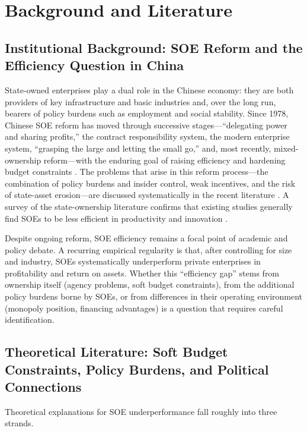 \documentclass[11pt,a4paper]{article}
\begin{document}
\section{Background and Literature}

\subsection{Institutional Background: SOE Reform and the Efficiency Question in China}

State-owned enterprises play a dual role in the Chinese economy: they are both providers of key infrastructure and basic industries and, over the long run, bearers of policy burdens such as employment and social stability. Since 1978, Chinese SOE reform has moved through successive stages---``delegating power and sharing profits,'' the contract responsibility system, the modern enterprise system, ``grasping the large and letting the small go,'' and, most recently, mixed-ownership reform---with the enduring goal of raising efficiency and hardening budget constraints \cite{ginting2020}. The problems that arise in this reform process---the combination of policy burdens and insider control, weak incentives, and the risk of state-asset erosion---are discussed systematically in the recent literature \cite{wu2024}. A survey of the state-ownership literature confirms that existing studies generally find SOEs to be less efficient in productivity and innovation \cite{asri2022}.

Despite ongoing reform, SOE efficiency remains a focal point of academic and policy debate. A recurring empirical regularity is that, after controlling for size and industry, SOEs systematically underperform private enterprises in profitability and return on assets. Whether this ``efficiency gap'' stems from ownership itself (agency problems, soft budget constraints), from the additional policy burdens borne by SOEs, or from differences in their operating environment (monopoly position, financing advantages) is a question that requires careful identification.

\subsection{Theoretical Literature: Soft Budget Constraints, Policy Burdens, and Political Connections}

Theoretical explanations for SOE underperformance fall roughly into three strands.
\end{document}
